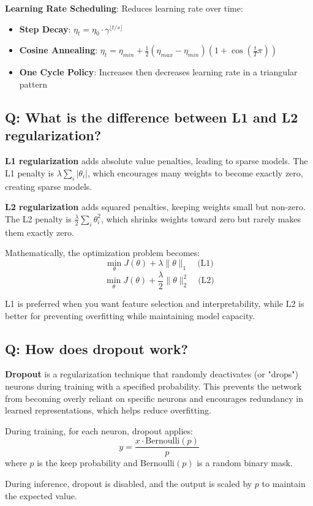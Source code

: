 \textbf{Learning Rate Scheduling}: Reduces learning rate over time:
\begin{itemize}
	\item \textbf{Step Decay}: \(\eta_t = \eta_0 \cdot \gamma^{\lfloor t/s \rfloor}\)
	\item \textbf{Cosine Annealing}: \(\eta_t = \eta_{min} + \frac{1}{2}(\eta_{max} - \eta_{min})(1 + \cos(\frac{t}{T}\pi))\)
	\item \textbf{One Cycle Policy}: Increases then decreases learning rate in a triangular pattern
\end{itemize}

\subsection*{Q: What is the difference between L1 and L2 regularization?}
\textbf{L1 regularization} adds absolute value penalties, leading to sparse models. The L1 penalty is \(\lambda \sum_{i} |\theta_i|\), which encourages many weights to become exactly zero, creating sparse models.

\textbf{L2 regularization} adds squared penalties, keeping weights small but non-zero. The L2 penalty is \(\frac{\lambda}{2} \sum_{i} \theta_i^2\), which shrinks weights toward zero but rarely makes them exactly zero.

Mathematically, the optimization problem becomes:
\[
\min_\theta J(\theta) + \lambda \|\theta\|_1 \quad \text{(L1)}
\]
\[
\min_\theta J(\theta) + \frac{\lambda}{2} \|\theta\|_2^2 \quad \text{(L2)}
\]

L1 is preferred when you want feature selection and interpretability, while L2 is better for preventing overfitting while maintaining model capacity.

\subsection*{Q: How does dropout work?}
\textbf{Dropout} is a regularization technique that randomly deactivates (or "drops") neurons during training with a specified probability. This prevents the network from becoming overly reliant on specific neurons and encourages redundancy in learned representations, which helps reduce overfitting.

During training, for each neuron, dropout applies:
\[
y = \frac{x \cdot \text{Bernoulli}(p)}{p}
\]
where \(p\) is the keep probability and \(\text{Bernoulli}(p)\) is a random binary mask.

During inference, dropout is disabled, and the output is scaled by \(p\) to maintain the expected value.

